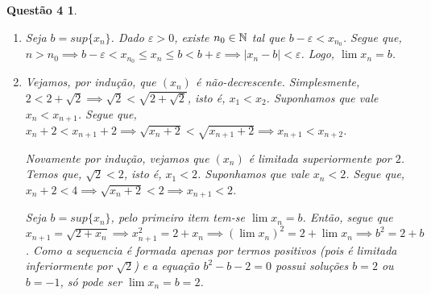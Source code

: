 \documentclass[a4paper,12pt]{article}
\newtheorem*{4}{Questão 4}
\begin{document}
\begin{4}
	
	\begin{enumerate}
		
		\item Seja $b = sup\{x_n\}$. Dado $\varepsilon > 0$, existe $n_0 \in \Bbb N$ tal que $b-\varepsilon < x_{n_0}$. Segue que, $n > n_0 \implies b - \varepsilon < x_{n_0} \leq x_n \leq b < b + \varepsilon \implies |x_n - b| < \varepsilon$. Logo, $\lim x_n = b$.
		
		\item Vejamos, por indução, que $(x_n)$ é não-decrescente. Simplesmente, $2 < 2 + \sqrt 2 \implies \sqrt 2 < \sqrt{2 + \sqrt 2}$, isto é, $x_1 < x_2$. Suponhamos que vale $x_n < x_{n+1}$. Segue que, $x_n + 2 < x_{n+1} + 2 \implies \sqrt{x_n + 2} < \sqrt{x_{n+1} + 2} \implies x_{n+1} < x_{n+2}$. 
		
		Novamente por indução, vejamos que $(x_n)$ é limitada superiormente por $2$. Temos que, $\sqrt 2 < 2$, isto é, $x_1 < 2$. Suponhamos que vale $x_n < 2$. Segue que, $x_n + 2 < 4 \implies \sqrt{x_n + 2} < 2 \implies x_{n+1} < 2$.
		
		Seja $b = sup\{x_n\}$, pelo primeiro item tem-se $\lim x_n = b$. Então, segue que $x_{n+1} = \sqrt{2 + x_n} \implies x_{n+1}^2 = 2 + x_n \implies (\lim x_n)^2 = 2 + \lim x_n \implies b^2 = 2 + b$. Como a sequencia é formada apenas por termos positivos (pois é limitada inferiormente por $\sqrt 2$) e a equação $b^2 - b - 2 = 0$ possui soluções $b = 2$ ou $b = -1$, só pode ser $\lim x_n = b = 2$.
		
	\end{enumerate}

\end{4}
\end{document}
